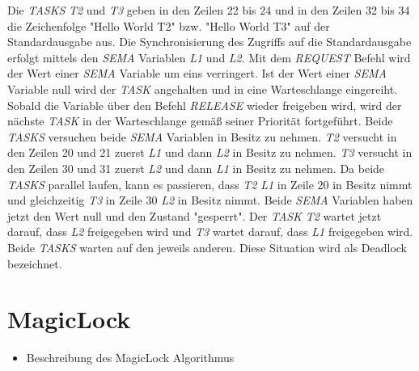 Die \textit{TASKS} \textit{T2} und \textit{T3} geben in den Zeilen 22 bis 24 und in den Zeilen 32 bis 34 die Zeichenfolge "Hello World T2" bzw. "Hello World T3" auf der Standardausgabe aus. Die Synchronisierung des Zugriffs auf die Standardausgabe erfolgt mittels den \textit{SEMA} Variablen \textit{L1} und \textit{L2}. Mit dem \textit{REQUEST} Befehl wird der Wert einer \textit{SEMA} Variable um eins verringert. Ist der Wert einer \textit{SEMA} Variable null wird der \textit{TASK} angehalten und in eine Warteschlange eingereiht. Sobald die Variable über den Befehl \textit{RELEASE} wieder freigeben wird, wird der nächste \textit{TASK} in der Warteschlange gemäß seiner Priorität fortgeführt. Beide \textit{TASKS} versuchen beide \textit{SEMA} Variablen in Besitz zu nehmen. \textit{T2} versucht in den Zeilen 20 und 21 zuerst \textit{L1} und dann \textit{L2} in Besitz zu nehmen. \textit{T3} versucht in den Zeilen 30 und 31 zuerst \textit{L2} und dann \textit{L1} in Besitz zu nehmen. Da beide \textit{TASKS} parallel laufen, kann es passieren, dass \textit{T2} \textit{L1} in Zeile 20 in Besitz nimmt und gleichzeitig \textit{T3} in Zeile 30 \textit{L2} in Besitz nimmt. Beide \textit{SEMA} Variablen haben jetzt den Wert null und den Zustand "gesperrt". Der \textit{TASK} \textit{T2} wartet jetzt darauf, dass \textit{L2} freigegeben wird und \textit{T3} wartet darauf, dass \textit{L1} freigegeben wird. Beide \textit{TASKS} warten auf den jeweils anderen. Diese Situation wird als Deadlock bezeichnet.

\section{MagicLock}
\label{section:MagicLock}
\begin{itemize}
  \item Beschreibung des MagicLock\autocite{MagicLock} Algorithmus
\end{itemize}